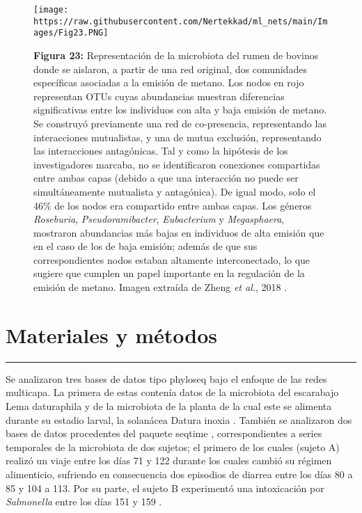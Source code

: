 \documentclass[
]{book}
\begin{document}
\begin{figure}
\centering
\texttt{[image: https://raw.githubusercontent.com/Nertekkad/ml\_nets/main/Images/Fig23.PNG]}
\caption{\textbf{Figura 23:} Representación de la microbiota del rumen de bovinos donde se aislaron, a partir de una red original, dos comunidades específicas asociadas a la emisión de metano. Los nodos en rojo representan OTUs cuyas abundancias muestran diferencias significativas entre los individuos con alta y baja emisión de metano. Se construyó previamente una red de co-presencia, representando las interacciones mutualistas, y una de mutua exclusión, representando las interacciones antagónicas. Tal y como la hipótesis de los investigadores marcaba, no se identificaron conexiones compartidas entre ambas capas (debido a que una interacción no puede ser simultáneamente mutualista y antagónica). De igual modo, solo el 46\% de los nodos era compartido entre ambas capas. Los géneros \emph{Roseburia}, \emph{Pseudoramibacter}, \emph{Eubacterium} y \emph{Megasphaera}, mostraron abundancias más bajas en individuos de alta emisión que en el caso de los de baja emisión; además de que sus correspondientes nodos estaban altamente interconectado, lo que sugiere que cumplen un papel importante en la regulación de la emisión de metano. Imagen extraída de Zheng \emph{et al.}, 2018 \citep{zheng2018improving}.}
\end{figure}

\hypertarget{materiales-y-muxe9todos}{%
\chapter*{Materiales y métodos}\label{materiales-y-muxe9todos}}

\begin{center}\rule{0.5\linewidth}{0.5pt}\end{center}

Se analizaron tres bases de datos tipo phyloseq bajo el enfoque de las redes multicapa. La primera de estas contenía datos de la microbiota del escarabajo Lema daturaphila y de la microbiota de la planta de la cual este se alimenta durante su estadio larval, la solanácea Datura inoxia \citep{mayoral2020extended}. También se analizaron dos bases de datos procedentes del paquete seqtime \citep{seqtime}, correspondientes a series temporales de la microbiota de dos sujetos; el primero de los cuales (sujeto A) realizó un viaje entre los días 71 y 122 durante los cuales cambió su régimen alimenticio, sufriendo en consecuencia dos episodios de diarrea entre los días 80 a 85 y 104 a 113. Por su parte, el sujeto B experimentó una intoxicación por \emph{Salmonella} entre los días 151 y 159 \citep{David2014}.
\end{document}
